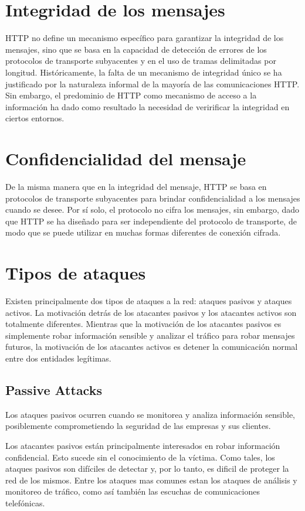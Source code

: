 \section{Integridad de los mensajes}

HTTP no define un mecanismo específico para garantizar la integridad de los 
mensajes, sino que se basa en la capacidad de detección de errores de los 
protocolos de transporte subyacentes y en el uso de tramas delimitadas por 
longitud. Históricamente, la falta de un mecanismo de integridad único se 
ha justificado por la naturaleza informal de la mayoría de las comunicaciones 
HTTP. Sin embargo, el predominio de HTTP como mecanismo de acceso a la 
información ha dado como resultado la necesidad de veririficar la integridad
en ciertos entornos.

\section{Confidencialidad del mensaje}

De la misma manera que en la integridad del mensaje, HTTP se basa en 
protocolos de transporte subyacentes para brindar confidencialidad a los 
mensajes cuando se desee. Por sí solo, el protocolo no cifra los mensajes, 
sin embargo, dado que HTTP se ha diseñado para ser independiente del protocolo de 
transporte, de modo que se puede utilizar en muchas formas diferentes de 
conexión cifrada.


\section{Tipos de ataques}
Existen principalmente dos tipos de ataques a la red: ataques pasivos y 
ataques activos. La motivación detrás de los atacantes pasivos y los atacantes 
activos son totalmente diferentes. Mientras que la motivación de los atacantes 
pasivos es simplemente robar información sensible y analizar el tráfico para 
robar mensajes futuros, la motivación de los atacantes activos es detener la 
comunicación normal entre dos entidades legítimas.

\subsection{Passive Attacks}
Los ataques pasivos ocurren cuando se monitorea y analiza 
información sensible, posiblemente comprometiendo la seguridad de las 
empresas y sus clientes. 

Los atacantes pasivos están principalmente interesados en robar información 
confidencial. Esto sucede sin el conocimiento de la víctima. Como tales, 
los ataques pasivos son difíciles de detectar y, por lo tanto, es dificil de
proteger la red de los mismos. Entre los ataques mas comunes estan los 
ataques de análisis y monitoreo de tráfico, como así también las 
escuchas de comunicaciones telefónicas.

